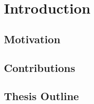 \chapter{Introduction}\label{chapter:introduction}
\section{Motivation}
\section{Contributions}
\section{Thesis Outline}

